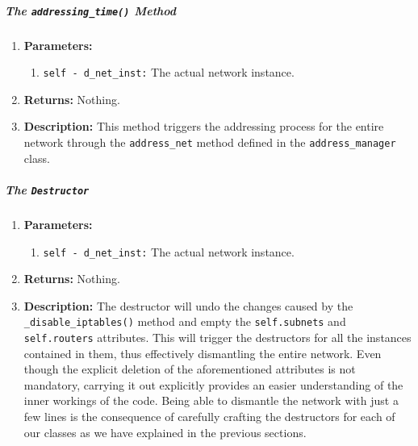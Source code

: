         \subparagraph{The \texttt{addressing\_time()} Method}
            \begin{enumerate}
                \item \textbf{Parameters:}
                \begin{enumerate}
                    \item \texttt{self - d\_net\_inst:} The actual network instance.
                \end{enumerate}
                \item \textbf{Returns:} Nothing.
                \item \textbf{Description:} This method triggers the addressing process for the entire network through the \texttt{address\_net} method defined in the \texttt{address\_manager} class.
            \end{enumerate}

        \subparagraph{The \texttt{Destructor}}
            \begin{enumerate}
                \item \textbf{Parameters:}
                \begin{enumerate}
                    \item \texttt{self - d\_net\_inst:} The actual network instance.
                \end{enumerate}
                \item \textbf{Returns:} Nothing.
                \item \textbf{Description:} The destructor will undo the changes caused by the \texttt{\_disable\_iptables()} method and empty the \texttt{self.subnets} and \texttt{self.routers} attributes. This will trigger the destructors for all the instances contained in them, thus effectively dismantling the entire network. Even though the explicit deletion of the aforementioned attributes is not mandatory, carrying it out explicitly provides an easier understanding of the inner workings of the code. Being able to dismantle the network with just a few lines is the consequence of carefully crafting the destructors for each of our classes as we have explained in the previous sections.
            \end{enumerate}
